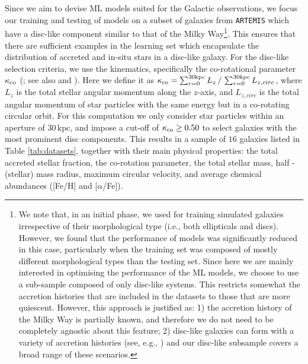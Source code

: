Since we aim to devise ML models suited for the Galactic observations, we focus our training and testing of models on a subset of galaxies from  \texttt{ARTEMIS} which have a disc-like component similar to that of the Milky Way\footnote{We note that, in an initial phase, we used for training simulated galaxies irrespective of their morphological type (i.e., both ellipticals and discs). However, we found that the performance of models was significantly reduced in this case, particularly when the training set was composed of mostly different morphological types than the testing set. Since here we are mainly interested in optimising the performance of the ML models, we choose to use a sub-sample composed of only disc-like systems. This restricts somewhat the accretion histories that are included in the datasets to those that are more quiescent. However, this approach is justified as: 1) the accretion history of the Milky Way is partially known, and therefore we do not need to be completely agnostic about this feature; 2) disc-like galaxies can form with a variety of accretion histories (see, e.g., \citealt{Font2017}) and our disc-like subsample covers a broad range of these scenarios.}. This ensures that there are sufficient examples in the learning set which encapsulate the distribution of accreted and in-situ stars in a disc-like galaxy. For the disc-like selection criteria, we use the kinematics, specifically the co-rotational parameter $\kappa_{\rm co}$ (\citealt{Abadi2003}; see also \citealt{Font2020} and \citealt{Dillamore2022}). Here we define it as $\kappa_{\rm co}=  \sum_{r=0}^{30\mathrm{kpc}} L_{z} \, / \, \sum_{r=0}^{30\mathrm{kpc}} L_{z,circ}$, where $L_{z}$ is the total stellar angular momentum along the $z$-axis, and  $L_{z,circ}$ is the total angular momentum of star particles with the same energy but in a co-rotating circular orbit. For this computation we only consider star particles within an aperture of $30 \, \mathrm{kpc}$, and impose a cut-off of $\kappa_{\rm co} \geq 0.50$ to select galaxies with the most prominent disc components. This results in a sample of $16$ galaxies listed in Table \ref{tab:datasets}, together with their main physical properties: the total accreted stellar fraction, the co-rotation parameter, the total stellar mass, half -(stellar) mass radius, maximum circular velocity, and average chemical abundances ([Fe/H] and [$\alpha$/Fe]).

